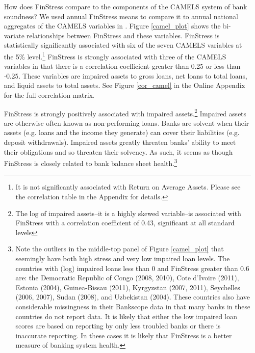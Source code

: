 \documentclass[]{article}
\begin{document}
How does FinStress compare to the components of the CAMELS system of bank soundness? We used annual FinStress means to compare it to annual national aggregates of the CAMELS variables in \cite{Andrianova2015}. Figure \ref{camel_plot} shows the bi-variate relationships between FinStress and these variables. FinStress is statistically significantly associated with six of the seven CAMELS variables at the 5\% level.\footnote{It is not significantly associated with Return on Average Assets. Please see the correlation table in the Appendix for details.} FinStress is strongly associated with three of the CAMELS variables in that there is a correlation coefficient greater than 0.25 or less than -0.25. These variables are impaired assets to gross loans, net loans to total loans, and liquid assets to total assets. See Figure \ref{cor_camel} in the Online Appendix for the full correlation matrix.

FinStress is strongly positively associated with impaired assets.\footnote{The log of impaired assets--it is a highly skewed variable--is associated with FinStress with a correlation coefficient of 0.43, significant at all standard levels} Impaired assets are otherwise often known as non-performing loans. Banks are solvent when their assets (e.g. loans and the income they generate) can cover their liabilities (e.g. deposit withdrawals). Impaired assets greatly threaten banks' ability to meet their obligations and so threaten their solvency. As such, it seems as though FinStress is closely related to bank balance sheet health.\footnote{Note the outliers in the middle-top panel of Figure \ref{camel_plot} that seemingly have both high stress and very low impaired loan levels. The countries with (log) impaired loans less than 0 and FinStress greater than 0.6 are: the Democratic Republic of Congo (2008, 2010), Cote d'Ivoire (2011), Estonia (2004), Guinea-Bissau (2011), Kyrgyzstan (2007, 2011), Seychelles (2006, 2007), Sudan (2008), and Uzbekistan (2004). These countries also have considerable missingness in their Bankscope data in that many banks in these countries do not report data. It is likely that either the low impaired loan scores are based on reporting by only less troubled banks or there is inaccurate reporting. In these cases it is likely that FinStress is a better measure of banking system health.}
\end{document}
